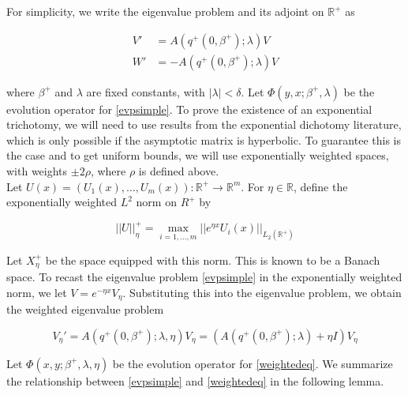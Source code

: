 \documentclass[12pt]{article}
\def\R{{\mathbb R}}
\begin{document}
For simplicity, we write the eigenvalue problem and its adjoint on $\R^+$ as 

\begin{align}
V' &= A(q^+(0, \beta^+); \lambda) V \label{evpsimple}\\
W' &= -A(q^+(0, \beta^+); \lambda) V \label{evpsimpleW}
\end{align}

where $\beta^+$ and $\lambda$ are fixed constants, with $|\lambda| < \delta$. Let $\Phi(y, x; \beta^+, \lambda)$ be the evolution operator for \eqref{evpsimple}. To prove the existence of an exponential trichotomy, we will need to use results from the exponential dichotomy literature, which is only possible if the asymptotic matrix is hyperbolic. To guarantee this is the case and to get uniform bounds, we will use exponentially weighted spaces, with weights $\pm 2 \rho$, where $\rho$ is defined above.\\

Let $U(x) = (U_1(x), \dots, U_m(x)): \R^+ \rightarrow \R^m$. For $\eta \in \R$, define the exponentially weighted $L^2$ norm on $R^+$ by

\[
||U||_\eta^+ = \max_{i = 1, \dots, m} ||e^{\eta x}U_i(x)||_{L_2(\R^+)}
\]

Let $X^+_\eta$ be the space equipped with this norm. This is known to be a Banach space. To recast the eigenvalue problem \eqref{evpsimple} in the exponentially weighted norm, we let $V = e^{-\eta x} V_\eta$. Substituting this into the eigenvalue problem, we obtain the weighted eigenvalue problem

\begin{equation}\label{weightedeq}
V_\eta' = A(q^+(0, \beta^+); \lambda, \eta) V_\eta = (A(q^+(0, \beta^+); \lambda) + \eta I) V_\eta
\end{equation}

Let $\Phi(x, y; \beta^+, \lambda, \eta)$ be the evolution operator for \eqref{weightedeq}. We summarize the relationship between \eqref{evpsimple} and \eqref{weightedeq} in the following lemma.

\end{document}
